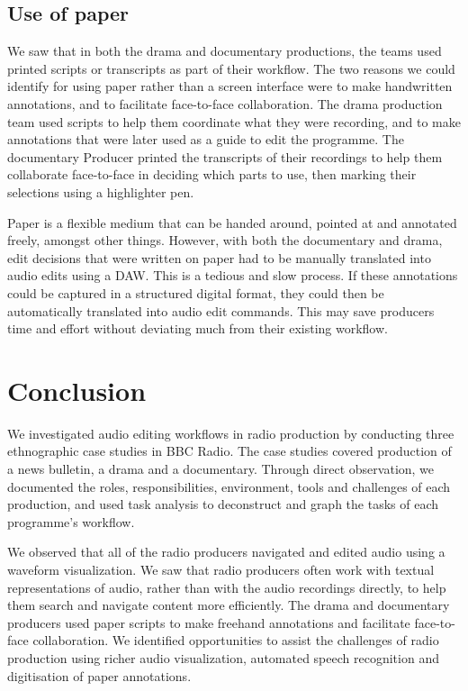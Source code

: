 \subsection{Use of paper}
We saw that in both the drama and documentary productions, the teams used printed scripts or transcripts as part of
their workflow. The two reasons we could identify for using paper rather than a screen interface were to make
handwritten annotations, and to facilitate face-to-face collaboration.  The drama production team used scripts to help
them coordinate what they were recording, and to make annotations that were later used as a guide to edit the
programme. The documentary Producer printed the transcripts of their recordings to help them collaborate face-to-face
in deciding which parts to use, then marking their selections using a highlighter pen.

Paper is a flexible medium that can be handed around, pointed at and annotated freely, amongst other things.  However,
with both the documentary and drama, edit decisions that were written on paper had to be manually translated into audio
edits using a DAW. This is a tedious and slow process. If these annotations could be captured in a structured digital
format, they could then be automatically translated into audio edit commands. This may save producers time and effort
without deviating much from their existing workflow.

\section{Conclusion}\label{sec:ethno-conclusion}
We investigated audio editing workflows in radio production by conducting three ethnographic case studies in BBC
Radio. The case studies covered production of a news bulletin, a drama and a documentary.  Through direct observation,
we documented the roles, responsibilities, environment, tools and challenges of each production, and used task analysis
to deconstruct and graph the tasks of each programme's workflow.

We observed that all of the radio producers navigated and edited audio using a waveform visualization. We saw that
radio producers often work with textual representations of audio, rather than with the audio recordings directly, to
help them search and navigate content more efficiently.  The drama and documentary producers used paper scripts to make
freehand annotations and facilitate face-to-face collaboration.  We identified opportunities to assist the challenges
of radio production using richer audio visualization, automated speech recognition and digitisation of paper
annotations.

